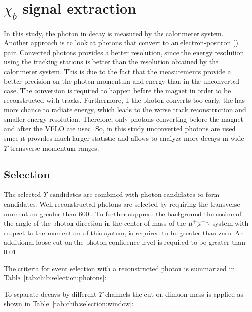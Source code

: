 \section{\texorpdfstring{$\chi_b$}{xb} signal extraction}
\label{sec:chib}

In this study, the photon in \chib decay is measured by the calorimeter system.
Another approach is to look at photons that convert to an electron-positron
(\epem) pair. Converted photons provides a better resolution, since the energy
resolution using the tracking stations is better than the resolution obtained
by the calorimeter system. This is due to the fact that the \epm measurements
provide a better precision on the photon momentum and energy than in the
unconverted case. The conversion is required to happen before the magnet in
order to be reconstructed with tracks. Furthermore, if the photon converts too
early, the \epm has more chance to radiate energy, which leads to the worse
track reconstruction and smaller energy resolution. Therefore, only photons
converting before the magnet and after the VELO are used. So, in this study
unconverted photons are used since it provides much larger statistic and allows
to analyze more decays in wide $\Upsilon$ transverse momentum ranges.

\subsection{Selection}
\label{sec:chib:selection}

The selected $\Upsilon$ candidates  are combined with photon candidates to form
\chib candidates. Well reconstructed photons are selected by requiring the
transverse momentum greater than 600 \mevc. To further suppress the background
the cosine of the angle of the photon direction in the center-of-mass of the
${\mu^+\mu^-}\gamma$ system with respect to the momentum of this system, is required to
be greater than zero. An additional loose cut on the photon confidence level is
required to be greater than 0.01.

The criteria for event selection with a reconstructed photon is summarized in
Table~\ref{tab:chib:selection:photons}:



To separate decays by different $\Upsilon$ channels the cut on dimuon mass is
applied as shown in Table~\ref{tab:chib:selection:window}:

